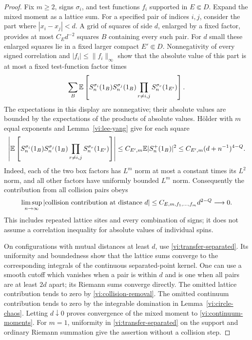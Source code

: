 \begin{proof}
Fix $m\geq2$, signs $\sigma_i$, and test functions $f_i$ supported in
$E\Subset D$.  Expand the mixed moment as a lattice sum.
For a specified pair of indices $i,j$, consider the part where
$|x_i-x_j|<d$.  A grid of squares of side $d$, enlarged by a fixed factor,
provides at most $C_Ed^{-2}$ squares $B$ containing every such pair.
For $d$ small these enlarged squares lie in a fixed larger compact
$E'\Subset D$.  Nonnegativity of every signed correlation and
$|f_i|\leq\|f_i\|_\infty$ show that the absolute value of this part is
at most a fixed test-function factor times
\[
 \sum_B\mathbb E\left[
   S_n^{\sigma_i}(1_B)S_n^{\sigma_j}(1_B)
       \prod_{r\ne i,j}S_n^{\sigma_r}(1_{E'})\right].
\]
The expectations in this display are nonnegative; their absolute values
are bounded by the expectations of the products of absolute values.
H\"older with $m$ equal exponents and Lemma~\ref{vi:lee-yang} give for
each square
\[
 \left|\mathbb E\left[
   S_n^{\sigma_i}(1_B)S_n^{\sigma_j}(1_B)
        \prod_{r\ne i,j}S_n^{\sigma_r}(1_{E'})\right]\right|
 \leq C_{E',m}\mathbb E|S_n^+(1_B)|^2
 \leq C_{E',m}(d+n^{-1})^{4-Q}.
\]
Indeed, each of the two box factors has $L^m$ norm at most a constant
times its $L^2$ norm, and all other factors have uniformly bounded
$L^m$ norm.  Consequently the contribution from all collision pairs obeys
\begin{equation}\label{vi:collision-removal}
 \limsup_{n\to\infty}
       |\hbox{collision contribution at distance }d|
       \leq C_{E,m,f_1,\ldots,f_m}d^{2-Q}\longrightarrow0.
\end{equation}
This includes repeated lattice sites and every combination of signs;
it does not assume a correlation inequality for absolute values of
individual spins.

On configurations with mutual distances at least $d$, use
\eqref{vi:transfer-separated}.  Its uniformity and boundedness show
that the lattice sums converge to the corresponding integrals of the
continuous separated-point kernel.  One can use a smooth cutoff which
vanishes when a pair is within $d$ and is one when all pairs are at least
$2d$ apart; its Riemann sums converge directly.  The omitted lattice
contribution tends to zero by \eqref{vi:collision-removal}.  The omitted
continuum contribution tends to zero by the integrable domination in
Lemma~\ref{vi:circle-chaos}.  Letting $d\downarrow0$ proves convergence
of the mixed moment to \eqref{vi:continuum-moments}.
For $m=1$, uniformity in \eqref{vi:transfer-separated} on the support
and ordinary Riemann summation give the assertion without a collision step.


\end{proof}
